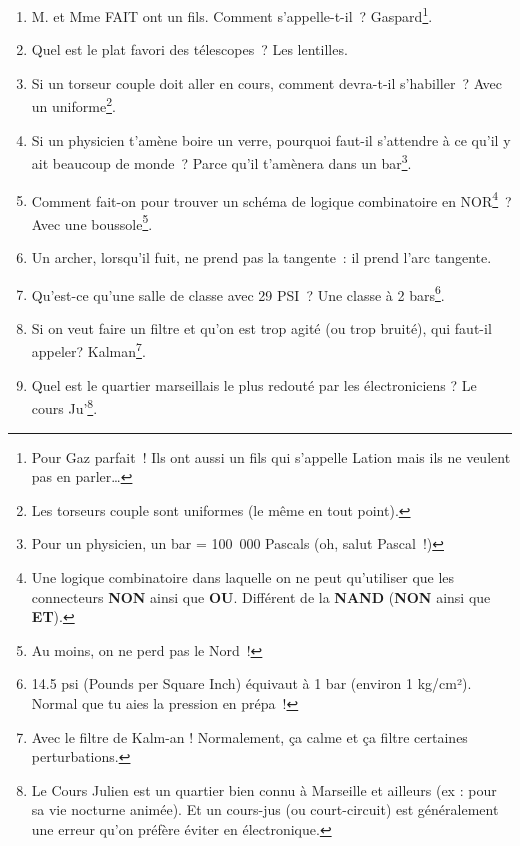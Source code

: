 \documentclass[10pt,a5paper,fullpage]{book}
\begin{document}
\begin{enumerate}
		\textit{\underline{Variante}~: Une prise électrique rend droit comme un} I.\footnote{Le courant est souvent noté I (pour l'intensité) et se mesure en Ampères.} 
		\item M. et Mme FAIT ont un fils. Comment s’appelle-t-il~? Gaspard\footnote{Pour Gaz parfait~! Ils ont aussi un fils qui s’appelle Lation mais ils ne veulent pas en parler\ldots}.
		\item Quel est le plat favori des télescopes~? Les lentilles.
		\item Si un torseur couple doit aller en cours, comment devra-t-il s’habiller~? Avec un uniforme\footnote{Les torseurs couple sont uniformes (le même en tout point).}.
		\item Si un physicien t’amène boire un verre, pourquoi faut-il s’attendre à ce qu’il y ait beaucoup de monde~? Parce qu’il t’amènera dans un bar\footnote{Pour un physicien, un bar = 100 000 Pascals (oh, salut Pascal~!)}.
		\item Comment fait-on pour trouver un schéma de logique combinatoire en NOR\footnote{Une logique combinatoire dans laquelle on ne peut qu’utiliser que les connecteurs \textbf{NON} ainsi que \textbf{OU}. Différent de la \textbf{NAND} (\textbf{NON} ainsi que \textbf{ET}).}~? Avec une boussole\footnote{Au moins, on ne perd pas le Nord~!}.
		\item Un archer, lorsqu’il fuit, ne prend pas la tangente~: il prend l’arc tangente.
		\item Qu’est-ce qu’une salle de classe avec 29 PSI~? Une classe à 2 bars\footnote{14.5 psi (Pounds per Square Inch) équivaut à 1 bar (environ 1 kg/cm²). Normal que tu aies la pression en prépa~!}.
		\item Si on veut faire un filtre et qu'on est trop agité (ou trop bruité), qui faut-il appeler? Kalman\footnote{Avec le filtre de Kalm-an ! Normalement, ça calme et ça filtre certaines perturbations.}.
		\item Quel est le quartier marseillais le plus redouté par les électroniciens ? Le cours Ju'\footnote{Le Cours Julien est un quartier bien connu à Marseille et ailleurs (ex : pour sa vie nocturne animée). Et un cours-jus (ou court-circuit) est généralement une erreur qu'on préfère éviter en électronique.}.
	\end{enumerate}
	
\end{document}
